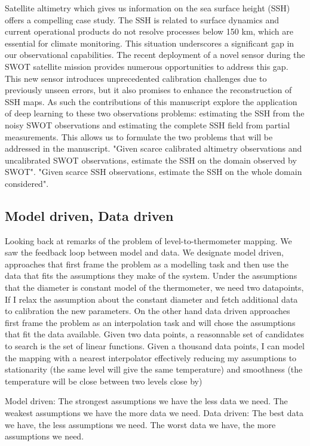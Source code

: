 \begin{bibunit}
  Satellite altimetry which gives us information on the sea surface height (SSH) offers a compelling case study.
  The SSH is related to surface dynamics and current operational products do not resolve processes below 150 km, which are essential for climate monitoring.
  This situation underscores a significant gap in our observational capabilities.
  The recent deployment of a novel sensor during the SWOT satellite mission provides numerous opportunities to address this gap.
  This new sensor introduces unprecedented calibration challenges due to previously unseen errors, but it also promises to enhance the reconstruction of SSH maps.
  As such the contributions of this manuscript explore the application of deep learning to these two observations problems: estimating the SSH from the noisy SWOT observations and estimating the complete SSH field from partial measurements.
  This allows us to formulate the two problems that will be addressed in the manuscript.
  "Given scarce calibrated altimetry observations and uncalibrated SWOT observations, estimate the SSH on the domain observed by SWOT".
  "Given scarce SSH observations, estimate the SSH on the whole domain considered".


\subsection{Model driven, Data driven}
Looking back at remarks of the problem of level-to-thermometer mapping. We saw the feedback loop between model and data.
We designate model driven, approaches that first frame the problem as a modelling task and then use the data that fits the assumptions they make of the system.
Under the assumptions that the diameter is constant model of the thermometer, we need two datapoints, If I relax the assumption about the constant diameter and fetch additional data to calibration the new parameters.
On the other hand data driven approaches first frame the problem as an interpolation task and will chose the assumptions that fit the data available.
Given two data points, a reasonnable set of candidates to search is the set of linear functions. Given a thousand data points, I can model the mapping with a nearest interpolator effectively reducing my assumptions to stationarity (the same level will give the same temperature) and smoothness (the temperature will be close between two levels close by)

Model driven: The strongest assumptions we have the less data we need. The weakest assumptions we have the more data we need.
Data driven: The best data we have, the less assumptions we need. The worst data we have, the more assumptions we need.



\end{bibunit}
